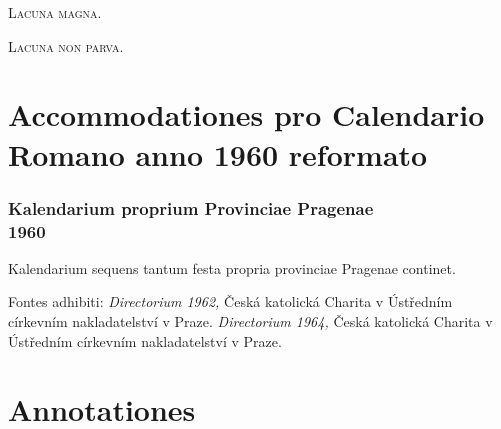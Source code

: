 \documentclass[12pt, a5paper, twoside]{book}
\begin{document}
\vfill
{\Large \textsc{Lacuna magna.}}




\vfill
{\Large \textsc{Lacuna non parva.}}

\part{Accommodationes pro Calendario Romano anno 1960 reformato}

\section*{Kalendarium proprium Provinciae Pragenae\\1960}

{\footnotesize
  Kalendarium sequens tantum festa propria provinciae Pragenae
  continet.

  Fontes adhibiti:
  \emph{Directorium 1962,} Česká katolická Charita v Ústředním církevním nakladatelství v Praze.
  \emph{Directorium 1964,} Česká katolická Charita v Ústředním církevním nakladatelství v Praze.
}


\cleardoublepage




\part{Annotationes}





\printbibliography[title=Fontes manuscripti, keyword=source, keyword=manuscript, heading=subbibliography]
\printbibliography[title=Fontes typis impressi, keyword=source, notkeyword=manuscript, heading=subbibliography]

\printbibliography[notkeyword=source, heading=subbibliography]
\end{document}
